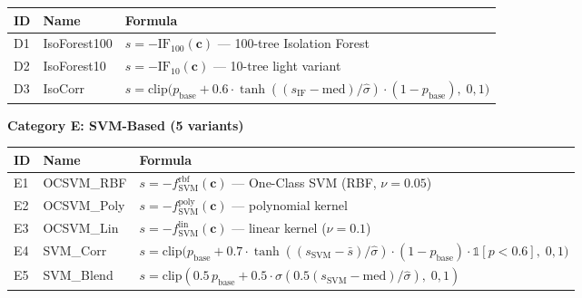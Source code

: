 \documentclass[
  11pt,
]{article}
\newcounter{none} %
\begin{document}
{\def\LTcaptype{none} %
\begin{longtable}[]{@{}
  >{\raggedright\arraybackslash}p{}
  >{\raggedright\arraybackslash}p{}
  >{\raggedright\arraybackslash}p{}@{}}
\toprule\noalign{}
\begin{minipage}[b]{\linewidth}\raggedright
ID
\end{minipage} & \begin{minipage}[b]{\linewidth}\raggedright
Name
\end{minipage} & \begin{minipage}[b]{\linewidth}\raggedright
Formula
\end{minipage} \\
\midrule\noalign{}
\endhead
\bottomrule\noalign{}
\endlastfoot
D1 & IsoForest100 & \(s = -\text{IF}_{100}(\mathbf{c})\) — 100-tree
Isolation Forest \\
D2 & IsoForest10 & \(s = -\text{IF}_{10}(\mathbf{c})\) — 10-tree light
variant \\
D3 & IsoCorr &
\(s = \text{clip}\big(p_{\text{base}} + 0.6 \cdot \tanh((s_{\text{IF}}-\text{med})/\hat{\sigma}) \cdot (1-p_{\text{base}}),\; 0, 1\big)\) \\
\end{longtable}
}

\textbf{Category E: SVM-Based (5 variants)}

{\def\LTcaptype{none} %
\begin{longtable}[]{@{}
  >{\raggedright\arraybackslash}p{}
  >{\raggedright\arraybackslash}p{}
  >{\raggedright\arraybackslash}p{}@{}}
\toprule\noalign{}
\begin{minipage}[b]{\linewidth}\raggedright
ID
\end{minipage} & \begin{minipage}[b]{\linewidth}\raggedright
Name
\end{minipage} & \begin{minipage}[b]{\linewidth}\raggedright
Formula
\end{minipage} \\
\midrule\noalign{}
\endhead
\bottomrule\noalign{}
\endlastfoot
E1 & OCSVM\_RBF & \(s = -f_{\text{SVM}}^{\text{rbf}}(\mathbf{c})\) —
One-Class SVM (RBF, \(\nu=0.05\)) \\
E2 & OCSVM\_Poly & \(s = -f_{\text{SVM}}^{\text{poly}}(\mathbf{c})\) —
polynomial kernel \\
E3 & OCSVM\_Lin & \(s = -f_{\text{SVM}}^{\text{lin}}(\mathbf{c})\) —
linear kernel (\(\nu=0.1\)) \\
E4 & SVM\_Corr &
\(s = \text{clip}\big(p_{\text{base}} + 0.7 \cdot \tanh((s_{\text{SVM}}-\bar{s})/\hat{\sigma}) \cdot (1-p_{\text{base}}) \cdot \mathbb{1}[p<0.6],\; 0, 1\big)\) \\
E5 & SVM\_Blend &
\(s = \text{clip}(0.5\, p_{\text{base}} + 0.5 \cdot \sigma(0.5(s_{\text{SVM}}-\text{med})/\hat{\sigma}),\; 0, 1)\) \\
\end{longtable}
}
\end{document}
